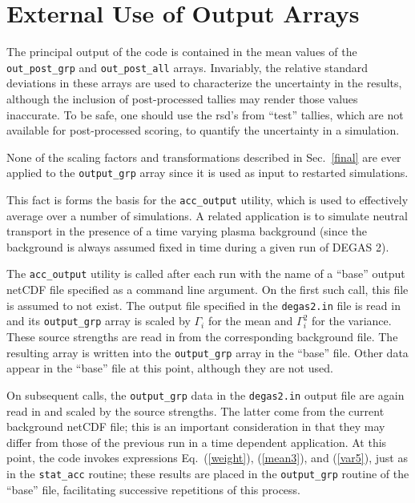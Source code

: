 \documentclass[12pt]{report}
\begin{document}
\section{External Use of Output Arrays}

The principal output of the code is contained in the
mean values of the {\tt out\_post\_grp} and
{\tt out\_post\_all} arrays.  Invariably,
the relative standard deviations in these arrays
are used to characterize the uncertainty
in the results, although the inclusion of
post-processed tallies may render those 
values inaccurate.  To be safe, one should use
the rsd's from ``test'' tallies, which 
are not available for post-processed scoring,
to quantify the uncertainty in a simulation.

None of the
scaling factors and transformations described 
in Sec.~\ref{final} are ever applied to the
{\tt output\_grp} array since it is used 
as input to
restarted simulations. 

This fact is forms the basis for the
{\tt acc\_output} utility, which is
used to effectively average over a number 
of simulations.  A related application is to
simulate neutral transport in the
presence of a 
time varying plasma background (since
the background is always assumed fixed
in time during a given run of DEGAS 2). 

The {\tt acc\_output} utility is called
after each run with the name of a ``base'' 
output netCDF file specified as a command line argument.
On the first such call, this file is assumed to
not exist.  The output file specified in the
{\tt degas2.in} file is read in and its 
{\tt output\_grp} array is scaled by 
$\Gamma_{i}$ for the mean and $\Gamma_{i}^{2}$ for
the variance.  These source strengths are
read in from the corresponding background file.
The resulting array is written
into the {\tt output\_grp} array in the ``base''
file.  Other data appear in the ``base''
file at this point, although they are not used.

On subsequent calls, the {\tt output\_grp}
data in the {\tt degas2.in} output file are again read
in and scaled by the source strengths.  The latter
come from the current background netCDF file;
this is an important consideration in that
they may differ from those of the previous run in
a time dependent application.  At this point,
the code invokes expressions Eq.~(\ref{weight}),
(\ref{mean3}), and (\ref{var5}), just as
in the {\tt stat\_acc} routine; these results
are placed in the {\tt output\_grp} routine of
the ``base'' file, facilitating successive
repetitions of this process.
\end{document}
